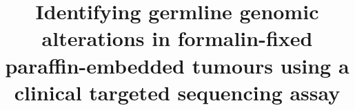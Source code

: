 \documentclass{bmcart}
\begin{document}
\begin{frontmatter}

\begin{fmbox}


\title{Identifying germline genomic alterations in formalin-fixed paraffin-embedded tumours using a clinical targeted sequencing assay}


\author[
   addressref={aff1},                   %
   corref={aff1},                       %
   noteref={n1},                        %
   email={eyap@bcgsc.ca}   %
]{ }
\author[
   addressref={aff1,aff2},
   email={akarsan@bcgsc.ca}
]{ }


\address[id=aff1]{%
  , %
  ,
  ,                     %
  ,                              %
}
\address[id=aff2]{%
  ,
  ,
  ,
}


\end{fmbox}
\end{frontmatter}
\end{document}
